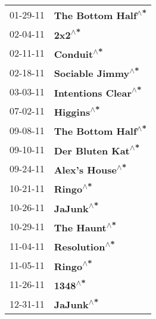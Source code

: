 \begin{supertabular}{p{0.25\columnwidth}p{0.75\columnwidth}}
 01-29-11 &   \textbf{The Bottom Half\textsuperscript{$\wedge$*}} \\
 02-04-11 &               \textbf{2x2\textsuperscript{$\wedge$*}} \\
 02-11-11 &           \textbf{Conduit\textsuperscript{$\wedge$*}} \\
 02-18-11 &    \textbf{Sociable Jimmy\textsuperscript{$\wedge$*}} \\
 03-03-11 &  \textbf{Intentions Clear\textsuperscript{$\wedge$*}} \\
 07-02-11 &           \textbf{Higgins\textsuperscript{$\wedge$*}} \\
 09-08-11 &   \textbf{The Bottom Half\textsuperscript{$\wedge$*}} \\
 09-10-11 &    \textbf{Der Bluten Kat\textsuperscript{$\wedge$*}} \\
 09-24-11 &      \textbf{Alex's House\textsuperscript{$\wedge$*}} \\
 10-21-11 &             \textbf{Ringo\textsuperscript{$\wedge$*}} \\
 10-26-11 &            \textbf{JaJunk\textsuperscript{$\wedge$*}} \\
 10-29-11 &         \textbf{The Haunt\textsuperscript{$\wedge$*}} \\
 11-04-11 &        \textbf{Resolution\textsuperscript{$\wedge$*}} \\
 11-05-11 &             \textbf{Ringo\textsuperscript{$\wedge$*}} \\
 11-26-11 &              \textbf{1348\textsuperscript{$\wedge$*}} \\
 12-31-11 &            \textbf{JaJunk\textsuperscript{$\wedge$*}} \\
\end{supertabular}
